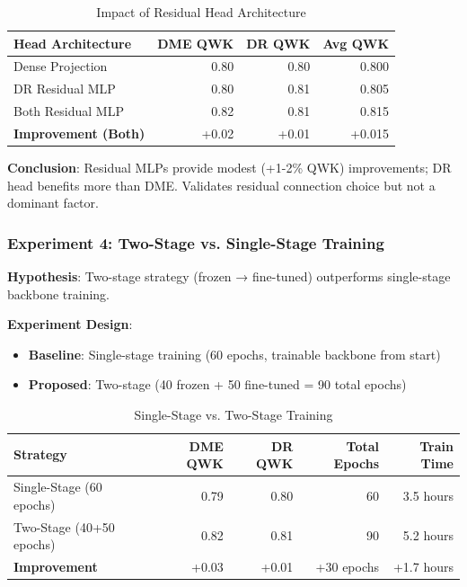 \documentclass[12pt,a4paper]{article}
\begin{document}
\begin{table}[H]
\centering
\small
\caption{Impact of Residual Head Architecture}
\begin{tabular}{|l|r|r|r|}
\hline
\textbf{Head Architecture} & \textbf{DME QWK} & \textbf{DR QWK} & \textbf{Avg QWK} \\
\hline
Dense Projection & 0.80 & 0.80 & 0.800 \\
DR Residual MLP & 0.80 & 0.81 & 0.805 \\
Both Residual MLP & 0.82 & 0.81 & 0.815 \\
\hline
\textbf{Improvement (Both)} & +0.02 & +0.01 & +0.015 \\
\hline
\end{tabular}
\end{table}

\textbf{Conclusion}: Residual MLPs provide modest (+1-2\% QWK) improvements; DR head benefits more than DME. Validates residual connection choice but not a dominant factor.

\subsubsection{Experiment 4: Two-Stage vs. Single-Stage Training}

\textbf{Hypothesis}: Two-stage strategy (frozen → fine-tuned) outperforms single-stage backbone training.

\textbf{Experiment Design}:
\begin{itemize}
    \item \textbf{Baseline}: Single-stage training (60 epochs, trainable backbone from start)
    \item \textbf{Proposed}: Two-stage (40 frozen + 50 fine-tuned = 90 total epochs)
\end{itemize}

\begin{table}[H]
\centering
\small
\caption{Single-Stage vs. Two-Stage Training}
\begin{tabular}{|l|r|r|r|r|}
\hline
\textbf{Strategy} & \textbf{DME QWK} & \textbf{DR QWK} & \textbf{Total Epochs} & \textbf{Train Time} \\
\hline
Single-Stage (60 epochs) & 0.79 & 0.80 & 60 & 3.5 hours \\
Two-Stage (40+50 epochs) & 0.82 & 0.81 & 90 & 5.2 hours \\
\hline
\textbf{Improvement} & +0.03 & +0.01 & +30 epochs & +1.7 hours \\
\hline
\end{tabular}
\end{table}
\end{document}
